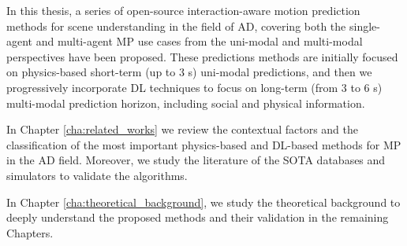 
In this thesis, a series of open-source interaction-aware motion prediction methods for scene understanding in the field of \ac{AD}, covering both the single-agent and multi-agent \ac{MP} use cases from the uni-modal and multi-modal perspectives have been proposed. These predictions methods are initially focused on physics-based short-term (up to 3 s) uni-modal predictions, and then we progressively incorporate \ac{DL} techniques to focus on long-term (from 3 to 6 s) multi-modal prediction horizon, including social and physical information.


In Chapter \ref{cha:related_works} we review the contextual factors and the classification of the most important physics-based and \acf{DL}-based methods for \acf{MP} in the \acf{AD} field. Moreover, we study the literature of the \acf{SOTA} databases and simulators to validate the algorithms.

In Chapter \ref{cha:theoretical_background}, we study the theoretical background to deeply understand the proposed methods and their validation in the remaining Chapters.

